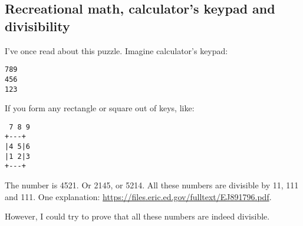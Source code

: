 \subsection{Recreational math, calculator's keypad and divisibility}

I've once read about this puzzle.
Imagine calculator's keypad:

\begin{lstlisting}
789
456
123
\end{lstlisting}

If you form any rectangle or square out of keys, like:

\begin{lstlisting}
 7 8 9
+---+
|4 5|6
|1 2|3
+---+
\end{lstlisting}

The number is 4521. Or 2145, or 5214.
All these numbers are divisible by 11, 111 and 111.
One explanation: \url{https://files.eric.ed.gov/fulltext/EJ891796.pdf}.

However, I could try to prove that all these numbers are indeed divisible.

